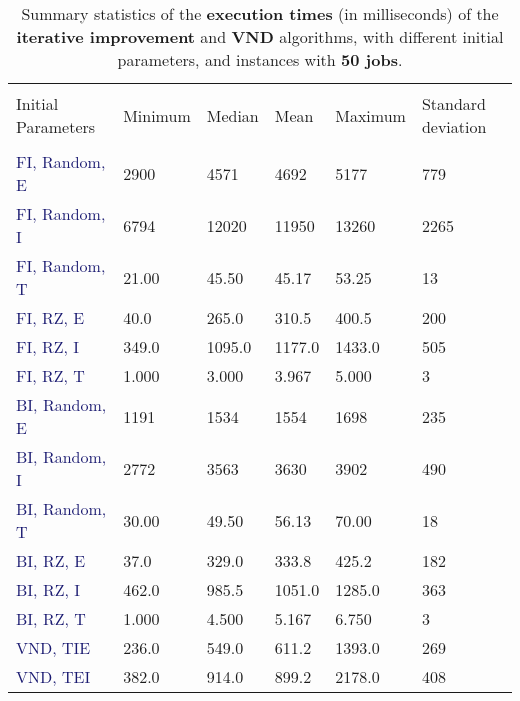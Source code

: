 \documentclass[
12pt,
a4paper,
oneside,
headinclude,
footinclude]{article}
\theoremstyle{definition} %
\begin{document}
    \begin{table}[H]
        \centering %
        \begin{tabular}{l l l l l l} %
            \hline
            \hline 
            \\[-1.5ex]
            \textcolor{BrickRed}{Initial Parameters} & \textcolor{BrickRed}{Minimum} & \textcolor{BrickRed}{Median} & \textcolor{BrickRed}{Mean} & \textcolor{BrickRed}{Maximum} & \textcolor{BrickRed}{Standard deviation}\\ [0.5ex]
            \hline %
            \\[-1.5ex]
           \textcolor{MidnightBlue}{FI, Random, E} 	 &   2900  &   4571  &  4692 &   5177 &  779 \\
           \textcolor{MidnightBlue}{FI, Random, I}    &   6794  &  12020  & 11950 &  13260 &  2265 \\
           \textcolor{MidnightBlue}{FI, Random, T}    &  21.00  &  45.50  & 45.17 &  53.25 &  13 \\
           \textcolor{MidnightBlue}{FI, RZ, E}        &   40.0  &  265.0  & 310.5 &  400.5 &  200 \\
           \textcolor{MidnightBlue}{FI, RZ, I}        &  349.0  & 1095.0  &1177.0 & 1433.0 &  505 \\
           \textcolor{MidnightBlue}{FI, RZ, T}        &  1.000  &  3.000  & 3.967 &  5.000 &  3 \\
           \textcolor{MidnightBlue}{BI, Random, E}    &   1191  &   1534  &  1554 &   1698 &  235 \\
           \textcolor{MidnightBlue}{BI, Random, I}    &   2772  &   3563  &  3630 &   3902 &  490 \\
           \textcolor{MidnightBlue}{BI, Random, T}    &  30.00  &  49.50  & 56.13 &  70.00 &  18 \\
           \textcolor{MidnightBlue}{BI, RZ, E}        &   37.0  &  329.0  & 333.8 &  425.2 &  182 \\
           \textcolor{MidnightBlue}{BI, RZ, I}        &  462.0  &  985.5  &1051.0 & 1285.0 &  363 \\
           \textcolor{MidnightBlue}{BI, RZ, T}        &  1.000  &  4.500  & 5.167 &  6.750 &  3 \\
           \textcolor{MidnightBlue}{VND, TIE}         & 236.0    &   549.0 &  611.2    &   1393.0   & 269\\
           \textcolor{MidnightBlue}{VND, TEI}         & 382.0    &   914.0 &  899.2   &   2178.0   & 408
            \\[1ex] %
            \hline %
        \end{tabular}
        \caption{\label{tab:50-exec}Summary statistics of the \textbf{execution times} (in milliseconds) of the \textbf{iterative improvement} and \textbf{VND} algorithms, with different initial parameters, and instances with \textbf{50 jobs}.}
    \end{table} 
\end{document}
